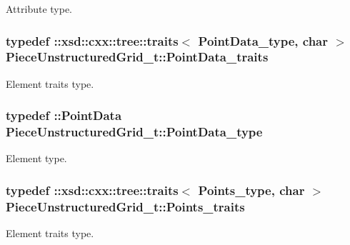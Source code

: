 Attribute type. 

\hypertarget{classPieceUnstructuredGrid__t_aee3c7ac7c46c4ebc9f248d31c458d300}{
\subsubsection[{Point\+Data\+\_\+traits}]{\setlength{\rightskip}{0pt plus 5cm}typedef \+::xsd\+::cxx\+::tree\+::traits$<$ {\bf Point\+Data\+\_\+type}, char $>$ {\bf Piece\+Unstructured\+Grid\+\_\+t\+::\+Point\+Data\+\_\+traits}}}\label{classPieceUnstructuredGrid__t_aee3c7ac7c46c4ebc9f248d31c458d300}


Element traits type. 

\hypertarget{classPieceUnstructuredGrid__t_a5d79d8ea03ca53f80f24e62c2175ec02}{
\subsubsection[{Point\+Data\+\_\+type}]{\setlength{\rightskip}{0pt plus 5cm}typedef \+::{\bf Point\+Data} {\bf Piece\+Unstructured\+Grid\+\_\+t\+::\+Point\+Data\+\_\+type}}}\label{classPieceUnstructuredGrid__t_a5d79d8ea03ca53f80f24e62c2175ec02}


Element type. 

\hypertarget{classPieceUnstructuredGrid__t_abdfd9c9f9eb5f43bd4cfcb2fad6d9f63}{
\subsubsection[{Points\+\_\+traits}]{\setlength{\rightskip}{0pt plus 5cm}typedef \+::xsd\+::cxx\+::tree\+::traits$<$ {\bf Points\+\_\+type}, char $>$ {\bf Piece\+Unstructured\+Grid\+\_\+t\+::\+Points\+\_\+traits}}}\label{classPieceUnstructuredGrid__t_abdfd9c9f9eb5f43bd4cfcb2fad6d9f63}


Element traits type. 

